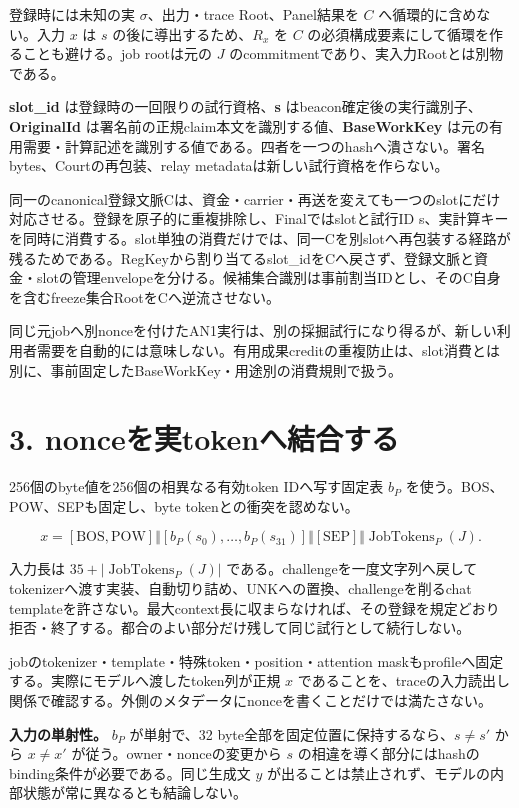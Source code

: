 \documentclass[
  10pt,
]{article}
\begin{document}
登録時には未知の実 \(\sigma\)、出力・trace Root、Panel結果を \(C\)
へ循環的に含めない。入力 \(x\) は \(s\) の後に導出するため、\(R_x\) を
\(C\) の必須構成要素にして循環を作ることも避ける。job rootは元の \(J\)
のcommitmentであり、実入力Rootとは別物である。

\textbf{slot\_id} は登録時の一回限りの試行資格、\textbf{s}
はbeacon確定後の実行識別子、\textbf{OriginalId}
は署名前の正規claim本文を識別する値、\textbf{BaseWorkKey}
は元の有用需要・計算記述を識別する値である。四者を一つのhashへ潰さない。署名bytes、Courtの再包装、relay
metadataは新しい試行資格を作らない。

同一のcanonical登録文脈Cは、資金・carrier・再送を変えても一つのslotにだけ対応させる。登録を原子的に重複排除し、Finalではslotと試行ID
s、実計算キーを同時に消費する。slot単独の消費だけでは、同一Cを別slotへ再包装する経路が残るためである。RegKeyから割り当てるslot\_idをCへ戻さず、登録文脈と資金・slotの管理envelopeを分ける。候補集合識別は事前割当IDとし、そのC自身を含むfreeze集合RootをCへ逆流させない。

同じ元jobへ別nonceを付けたAN1実行は、別の採掘試行になり得るが、新しい利用者需要を自動的には意味しない。有用成果creditの重複防止は、slot消費とは別に、事前固定したBaseWorkKey・用途別の消費規則で扱う。

\section{3.
nonceを実tokenへ結合する}\label{nonceux3092ux5b9ftokenux3078ux7d50ux5408ux3059ux308b}

256個のbyte値を256個の相異なる有効token IDへ写す固定表 \(b_P\)
を使う。BOS、POW、SEPも固定し、byte tokenとの衝突を認めない。

\[x=[\mathrm{BOS},\mathrm{POW}]\Vert[b_P(s_0),\ldots,b_P(s_{31})]\Vert[\mathrm{SEP}]\Vert\operatorname{JobTokens}_P(J).\]

入力長は \(35+|\operatorname{JobTokens}_P(J)|\)
である。challengeを一度文字列へ戻してtokenizerへ渡す実装、自動切り詰め、UNKへの置換、challengeを削るchat
templateを許さない。最大context長に収まらなければ、その登録を規定どおり拒否・終了する。都合のよい部分だけ残して同じ試行として続行しない。

jobのtokenizer・template・特殊token・position・attention
maskもprofileへ固定する。実際にモデルへ渡したtoken列が正規 \(x\)
であることを、traceの入力読出し関係で確認する。外側のメタデータにnonceを書くことだけでは満たさない。

\textbf{入力の単射性。} \(b_P\) が単射で、32
byte全部を固定位置に保持するなら、\(s\ne s'\) から \(x\ne x'\)
が従う。owner・nonceの変更から \(s\)
の相違を導く部分にはhashのbinding条件が必要である。同じ生成文 \(y\)
が出ることは禁止されず、モデルの内部状態が常に異なるとも結論しない。
\end{document}
